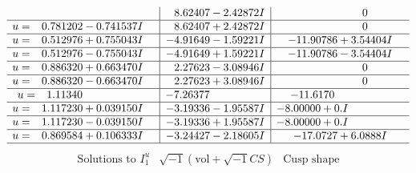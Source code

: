 \documentclass[1p]{elsarticle_modified}
\theoremstyle{definition}
\newcommand{\I}{\sqrt{-1}}
\begin{document}
$$\begin{array}{c|c|c}
 & \phantom{-}8.62407 - 2.42872 I & \phantom{-0.000000 } 0 \\ \hline\begin{aligned}
u &= \phantom{-}0.781202 - 0.741537 I\end{aligned}
 & \phantom{-}8.62407 + 2.42872 I & \phantom{-0.000000 } 0 \\ \hline\begin{aligned}
u &= \phantom{-}0.512976 + 0.755043 I\end{aligned}
 & -4.91649 - 1.59221 I & -11.90786 + 3.54404 I \\ \hline\begin{aligned}
u &= \phantom{-}0.512976 - 0.755043 I\end{aligned}
 & -4.91649 + 1.59221 I & -11.90786 - 3.54404 I \\ \hline\begin{aligned}
u &= \phantom{-}0.886320 + 0.663470 I\end{aligned}
 & \phantom{-}2.27623 - 3.08946 I & \phantom{-0.000000 } 0 \\ \hline\begin{aligned}
u &= \phantom{-}0.886320 - 0.663470 I\end{aligned}
 & \phantom{-}2.27623 + 3.08946 I & \phantom{-0.000000 } 0 \\ \hline\begin{aligned}
u &= \phantom{-}1.11340\phantom{ +0.000000I}\end{aligned}
 & -7.26377\phantom{ +0.000000I} & -11.6170\phantom{ +0.000000I} \\ \hline\begin{aligned}
u &= \phantom{-}1.117230 + 0.039150 I\end{aligned}
 & -3.19336 - 1.95587 I & -8.00000 + 0. I\phantom{ +0.000000I} \\ \hline\begin{aligned}
u &= \phantom{-}1.117230 - 0.039150 I\end{aligned}
 & -3.19336 + 1.95587 I & -8.00000 + 0. I\phantom{ +0.000000I} \\ \hline\begin{aligned}
u &= \phantom{-}0.869584 + 0.106333 I\end{aligned}
 & -3.24427 - 2.18605 I & -17.0727 + 6.0888 I\\
 \hline 
 \end{array}$$\newpage$$\begin{array}{c|c|c}  
\text{Solutions to }I^u_{1}& \I (\text{vol} + \sqrt{-1}CS) & \text{Cusp shape}\\

\end{array}$$
\end{document}
